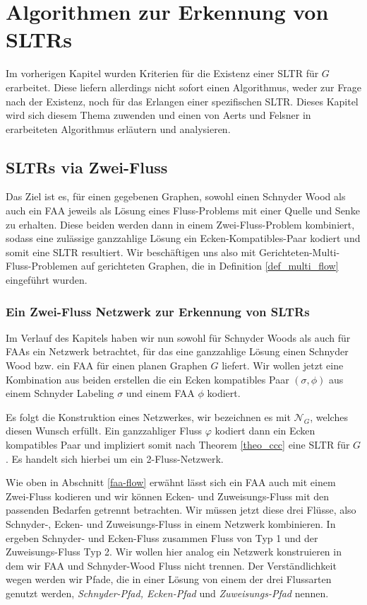 \chapter{Algorithmen zur Erkennung von SLTRs}\label{main_algo}

Im vorherigen Kapitel wurden Kriterien für die Existenz einer SLTR für $G$ erarbeitet. Diese liefern allerdings nicht sofort einen Algorithmus, weder zur Frage nach der Existenz, noch für das Erlangen einer spezifischen SLTR. Dieses Kapitel wird sich diesem Thema zuwenden und einen von Aerts und Felsner in \cite{af15} erarbeiteten Algorithmus erläutern und analysieren.

\section{SLTRs via Zwei-Fluss}

Das Ziel ist es, für einen gegebenen Graphen, sowohl einen Schnyder Wood als auch ein FAA jeweils als Lösung eines Fluss-Problems mit einer Quelle und Senke zu erhalten. Diese beiden werden dann in einem Zwei-Fluss-Problem kombiniert, sodass eine zulässige ganzzahlige Lösung ein Ecken-Kompatibles-Paar kodiert und somit eine SLTR resultiert. Wir beschäftigen uns also mit Gerichteten-Multi-Fluss-Problemen auf gerichteten Graphen, die in Definition \ref{def_multi_flow} eingeführt wurden.



\subsection{Ein Zwei-Fluss Netzwerk zur Erkennung von SLTRs}

Im Verlauf des Kapitels haben wir nun sowohl für Schnyder Woods als auch für FAAs ein Netzwerk betrachtet, für das eine ganzzahlige Lösung einen Schnyder Wood bzw. ein FAA für einen planen Graphen $G$ liefert. Wir wollen jetzt eine Kombination aus beiden erstellen die ein Ecken kompatibles Paar $(\sigma,\phi)$ aus einem Schnyder Labeling $\sigma$ und einem FAA $\phi$  kodiert.\

Es folgt die Konstruktion eines Netzwerkes, wir bezeichnen es mit $\mathcal{N}_G$, welches diesen Wunsch erfüllt. Ein ganzzahliger Fluss $\varphi$ kodiert dann ein Ecken kompatibles Paar und impliziert somit nach Theorem \ref{theo_ccc} eine SLTR für $G$. Es handelt sich hierbei um ein 2-Fluss-Netzwerk.

Wie oben in Abschnitt \ref{faa-flow} erwähnt lässt sich ein FAA auch mit einem Zwei-Fluss kodieren und wir können Ecken- und Zuweisungs-Fluss mit den passenden Bedarfen getrennt betrachten. Wir müssen jetzt diese drei Flüsse, also Schnyder-, Ecken- und Zuweisungs-Fluss in einem Netzwerk kombinieren. In \cite{af15} ergeben Schnyder- und Ecken-Fluss zusammen Fluss von Typ 1 und der Zuweisungs-Fluss Typ 2. Wir wollen hier analog ein Netzwerk konstruieren in dem wir FAA und Schnyder-Wood Fluss nicht trennen. Der Verständlichkeit wegen werden wir Pfade, die in einer Lösung von einem der drei Flussarten genutzt werden, \textit{Schnyder-Pfad, Ecken-Pfad} und \textit{Zuweisungs-Pfad} nennen.\\

